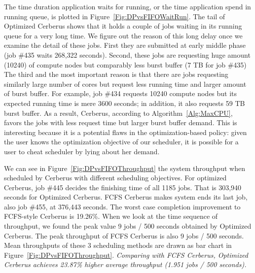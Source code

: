 The time duration application waits for running,
or the time application spend in running queue,
is plotted in Figure~\ref{Fig:DPvsFIFOWaitRun}.
The tail of Optimized Cerberus shows that it holds a couple of jobs waiting
in its running queue for a very long time.
We figure out the reason of this long delay once we examine the detail of these jobs.
First they are submitted at early middle phase (job \#435 waits 268,322 seconds).
Second, these jobs are requesting huge amount (10240) of compute nodes
but comparably less burst buffer (7 TB for job \#435)
The third and the most important reason is that there are jobs requesting similarly
large number of cores but request less running time and larger amount of burst buffer.
For example, job \#434 requests 10240 compute nodes
but its expected running time is mere 3600 seconds;
in addition, it also requests 59 TB burst buffer.
As a result, Cerberus, according to Algorithm~\ref{Alg:MaxCPU}, %
favors the jobs with less request time but larger burst buffer demand.
This is interesting because it is a potential flaws in the optimization-based policy:
given the user knows the optimization objective of our scheduler,
it is possible for a user to cheat scheduler by lying about her demand.


We can see in Figure~\ref{Fig:DPvsFIFOThroughput} the system throughput
when scheduled by Cerberus with different scheduling objectives.
For optimized Cerberus, job \#445 decides the finishing time of all 1185 jobs.
That is 303,940 seconds for Optimized Cerberus.
FCFS Cerberus makes system ends its last job, also job \#455, at 376,443 seconds.
The worst case completion improvement to FCFS-style Cerberus is 19.26\%.
When we look at the time sequence of throughput,
we found the peak value 9 jobs / 500 seconds obtained by Optimized Cerberus.
The peak throughput of FCFS Cerberus is also 9 jobs / 500 seconds.
Mean throughputs of these 3 scheduling methods are drawn
as bar chart in Figure~\ref{Fig:DPvsFIFOThroughput}.
\textit{Comparing with FCFS Cerberus, Optimized Cerberus achieves
23.87\% higher average throughput (1.951 jobs / 500 seconds).}






